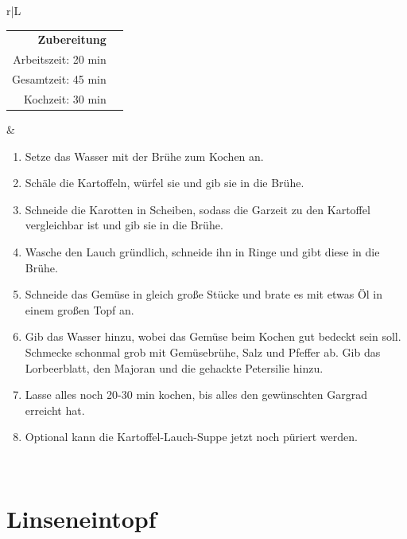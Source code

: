 \documentclass[a4paper, 12pt]{scrbook} 								%
\numberwithin{equation}{section} 									%
\begin{document}
\begin{tabularx}{\textwidth}{r|L}
\begin{tabular}[t]{rr}
				\textbf{Zubereitung}	\\
				Arbeitszeit: 20 min	\\
				Gesamtzeit:	45 min		\\
				Kochzeit: 30 min	\\
			\end{tabular}			&	\begin{enumerate}[]
											\item Setze das Wasser mit der Brühe zum Kochen an.
											\item Schäle die Kartoffeln, würfel sie und gib sie in die Brühe.
											\item Schneide die Karotten in Scheiben, sodass die Garzeit zu den Kartoffel vergleichbar ist und gib sie in die Brühe.
											\item Wasche den Lauch gründlich, schneide ihn in Ringe und gibt diese in die Brühe.
											
											\item Schneide das Gemüse in gleich große Stücke und brate es mit etwas Öl in einem großen Topf an.
											\item Gib das Wasser hinzu, wobei das Gemüse beim Kochen gut bedeckt sein soll. Schmecke schonmal grob mit Gemüsebrühe, Salz und Pfeffer ab. Gib das Lorbeerblatt, den Majoran und die gehackte Petersilie hinzu. 

											\item Lasse alles noch 20-30 min kochen, bis alles den gewünschten Gargrad erreicht hat.
											\item Optional kann die Kartoffel-Lauch-Suppe jetzt noch püriert werden.
										\end{enumerate}	\\
		\end{tabularx}
		\newpage



		\section{Linseneintopf}	\label{linseneintopf}
\end{document}
